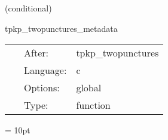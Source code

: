 \vspace{5mm}

   (conditional) 

\hspace{5mm} tpkp\_twopunctures\_metadata 

\hspace{5mm}{\it output twopunctures metadata } 


\hspace{5mm}

 \begin{tabular*}{160mm}{cll} 
~ & After:  & tpkp\_twopunctures \\ 
~ & Language:  & c \\ 
~ & Options:  & global \\ 
~ & Type:  & function \\ 
\end{tabular*} 



\vspace{5mm}\parskip = 10pt 
